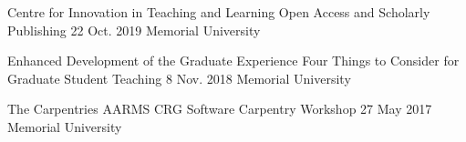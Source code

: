 \begin{cventries}
  \cventry
    {Centre for Innovation in Teaching and Learning} %
    {Open Access and Scholarly Publishing} %
    {22 Oct. 2019} %
    {Memorial University} %
    {
    }

  \cventry
    {Enhanced Development of the Graduate Experience} %
    {Four Things to Consider for Graduate Student Teaching} %
    {8 Nov. 2018} %
    {Memorial University} %
    {
    }

  \cventry
    {The Carpentries} %
    {AARMS CRG Software Carpentry Workshop} %
    {27 May 2017} %
    {Memorial University} %
    {
    }


\end{cventries}
